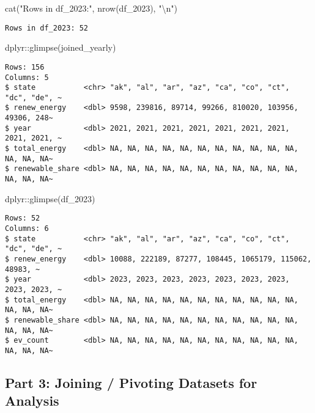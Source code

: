 \documentclass[
  english,
  letterpaper,
  DIV=11,
  numbers=noendperiod]{scrartcl}
\newenvironment{Shaded}{\begin{snugshade}}{\end{snugshade}}
\newcommand{\FunctionTok}[1]{\textcolor[rgb]{0.28,0.35,0.67}{#1}}
\newcommand{\NormalTok}[1]{\textcolor[rgb]{0.00,0.23,0.31}{#1}}
\newcommand{\SpecialCharTok}[1]{\textcolor[rgb]{0.37,0.37,0.37}{#1}}
\newcommand{\StringTok}[1]{\textcolor[rgb]{0.13,0.47,0.30}{#1}}
\begin{document}
\begin{Shaded}
\begin{Highlighting}[]
\FunctionTok{cat}\NormalTok{(}\StringTok{"Rows in df\_2023:"}\NormalTok{, }\FunctionTok{nrow}\NormalTok{(df\_2023), }\StringTok{"}\SpecialCharTok{\textbackslash{}n}\StringTok{"}\NormalTok{)}
\end{Highlighting}
\end{Shaded}

\begin{verbatim}
Rows in df_2023: 52 
\end{verbatim}

\begin{Shaded}
\begin{Highlighting}[]
\NormalTok{dplyr}\SpecialCharTok{::}\FunctionTok{glimpse}\NormalTok{(joined\_yearly)}
\end{Highlighting}
\end{Shaded}

\begin{verbatim}
Rows: 156
Columns: 5
$ state           <chr> "ak", "al", "ar", "az", "ca", "co", "ct", "dc", "de", ~
$ renew_energy    <dbl> 9598, 239816, 89714, 99266, 810020, 103956, 49306, 248~
$ year            <dbl> 2021, 2021, 2021, 2021, 2021, 2021, 2021, 2021, 2021, ~
$ total_energy    <dbl> NA, NA, NA, NA, NA, NA, NA, NA, NA, NA, NA, NA, NA, NA~
$ renewable_share <dbl> NA, NA, NA, NA, NA, NA, NA, NA, NA, NA, NA, NA, NA, NA~
\end{verbatim}

\begin{Shaded}
\begin{Highlighting}[]
\NormalTok{dplyr}\SpecialCharTok{::}\FunctionTok{glimpse}\NormalTok{(df\_2023)}
\end{Highlighting}
\end{Shaded}

\begin{verbatim}
Rows: 52
Columns: 6
$ state           <chr> "ak", "al", "ar", "az", "ca", "co", "ct", "dc", "de", ~
$ renew_energy    <dbl> 10088, 222189, 87277, 108445, 1065179, 115062, 48983, ~
$ year            <dbl> 2023, 2023, 2023, 2023, 2023, 2023, 2023, 2023, 2023, ~
$ total_energy    <dbl> NA, NA, NA, NA, NA, NA, NA, NA, NA, NA, NA, NA, NA, NA~
$ renewable_share <dbl> NA, NA, NA, NA, NA, NA, NA, NA, NA, NA, NA, NA, NA, NA~
$ ev_count        <dbl> NA, NA, NA, NA, NA, NA, NA, NA, NA, NA, NA, NA, NA, NA~
\end{verbatim}

\subsection{\texorpdfstring{\textbf{Part 3: Joining / Pivoting Datasets
for
Analysis}}{Part 3: Joining / Pivoting Datasets for Analysis}}\label{part-3-joining-pivoting-datasets-for-analysis}
\end{document}
